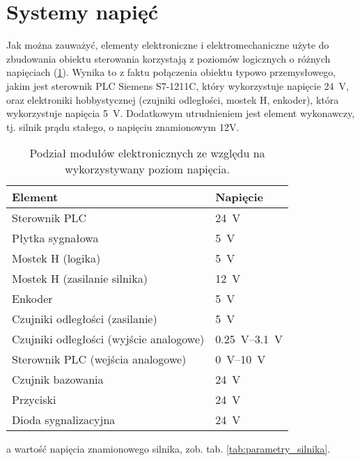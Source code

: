 \section{Systemy napięć}
\label{sec:ch3_systemy_napiec}

Jak można zauważyć, elementy elektroniczne i elektromechaniczne użyte do zbudowania obiektu sterowania korzystają z poziomów logicznych o różnych napięciach (\cref{tab:poziomy_napiec}). Wynika to z faktu połączenia obiektu typowo przemysłowego, jakim jest sterownik PLC Siemens S7-1211C, który wykorzystuje napięcie \SI{24}{\volt}, oraz elektroniki hobbystycznej (czujniki odległości, mostek H, enkoder), która wykorzystuje napięcia \SI{5}{\volt}. Dodatkowym utrudnieniem jest element wykonawczy, tj. silnik prądu stałego, o napięciu znamionowym 12V.

\begin{table}[h]
    \centering
    \begin{threeparttable}
        \caption{Podział modułów elektronicznych ze względu na wykorzystywany poziom napięcia.}
        \label{tab:poziomy_napiec}
        
        \begin{tabularx}{0.6\textwidth}{l | l}
            \toprule
            Element & Napięcie \\
            \midrule
            Sterownik PLC & \SI{24}{\volt} \\
            Płytka sygnałowa & \SI{5}{\volt} \\
            Mostek H (logika) & \SI{5}{\volt} \\
            Mostek H (zasilanie silnika)\tnote[a] & \SI{12}{\volt} \\
            Enkoder & \SI{5}{\volt} \\
            Czujniki odległości (zasilanie) & \SI{5}{\volt} \\
            Czujniki odległości (wyjście analogowe) & \SIrange{0,25}{3,1}{\volt} \\
            Sterownik PLC (wejścia analogowe) & \SIrange{0}{10}{\volt} \\
            Czujnik bazowania & \SI{24}{\volt} \\
            Przyciski & \SI{24}{\volt} \\
            Dioda sygnalizacyjna & \SI{24}{\volt} \\
            \bottomrule
        \end{tabularx}
        
        \begin{tablenotes}
            \footnotesize
            \item[a] wartość napięcia znamionowego silnika, zob. tab. \ref{tab:parametry_silnika}.
        \end{tablenotes}
    \end{threeparttable}
\end{table}

